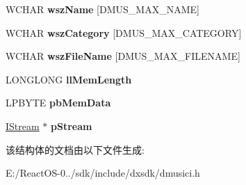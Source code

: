 \begin{DoxyCompactItemize}
W\+C\+H\+AR {\bfseries wsz\+Name} \mbox{[}D\+M\+U\+S\+\_\+\+M\+A\+X\+\_\+\+N\+A\+ME\mbox{]}
\item 
\mbox{\label{struct___d_m_u_s___o_b_j_e_c_t_d_e_s_c_a0ee54046dc44309558470b5b0fd47e02}} 
W\+C\+H\+AR {\bfseries wsz\+Category} \mbox{[}D\+M\+U\+S\+\_\+\+M\+A\+X\+\_\+\+C\+A\+T\+E\+G\+O\+RY\mbox{]}
\item 
\mbox{\label{struct___d_m_u_s___o_b_j_e_c_t_d_e_s_c_ae9afc05f95e2fbf2080797abc7c1a986}} 
W\+C\+H\+AR {\bfseries wsz\+File\+Name} \mbox{[}D\+M\+U\+S\+\_\+\+M\+A\+X\+\_\+\+F\+I\+L\+E\+N\+A\+ME\mbox{]}
\item 
\mbox{\label{struct___d_m_u_s___o_b_j_e_c_t_d_e_s_c_abdf3f8969e78e75177e2ebb5817f5436}} 
L\+O\+N\+G\+L\+O\+NG {\bfseries ll\+Mem\+Length}
\item 
\mbox{\label{struct___d_m_u_s___o_b_j_e_c_t_d_e_s_c_ad07800dab74ca568ffb0748151a8819d}} 
L\+P\+B\+Y\+TE {\bfseries pb\+Mem\+Data}
\item 
\mbox{\label{struct___d_m_u_s___o_b_j_e_c_t_d_e_s_c_a8b9c35ebd5e646067cfa1b90fa983290}} 
\hyperlink{interface_i_stream}{I\+Stream} $\ast$ {\bfseries p\+Stream}
\end{DoxyCompactItemize}


该结构体的文档由以下文件生成\+:\begin{DoxyCompactItemize}
\item 
E\+:/\+React\+O\+S-\/0../sdk/include/dxsdk/dmusici.\+h\end{DoxyCompactItemize}
